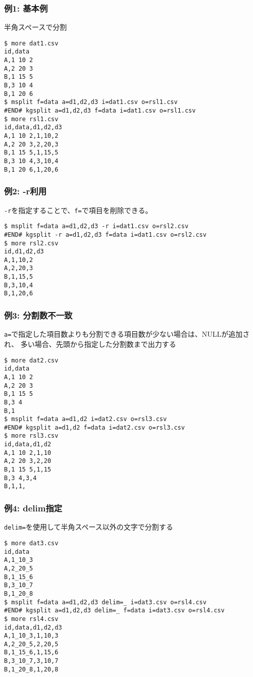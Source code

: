 \subsubsection*{例1: 基本例}

 半角スペースで分割


\begin{Verbatim}[baselinestretch=0.7,frame=single]
$ more dat1.csv
id,data
A,1 10 2
A,2 20 3
B,1 15 5
B,3 10 4
B,1 20 6
$ msplit f=data a=d1,d2,d3 i=dat1.csv o=rsl1.csv
#END# kgsplit a=d1,d2,d3 f=data i=dat1.csv o=rsl1.csv
$ more rsl1.csv
id,data,d1,d2,d3
A,1 10 2,1,10,2
A,2 20 3,2,20,3
B,1 15 5,1,15,5
B,3 10 4,3,10,4
B,1 20 6,1,20,6
\end{Verbatim}
\subsubsection*{例2: -r利用}

\verb|-r|を指定することで、\verb|f=|で項目を削除できる。


\begin{Verbatim}[baselinestretch=0.7,frame=single]
$ msplit f=data a=d1,d2,d3 -r i=dat1.csv o=rsl2.csv
#END# kgsplit -r a=d1,d2,d3 f=data i=dat1.csv o=rsl2.csv
$ more rsl2.csv
id,d1,d2,d3
A,1,10,2
A,2,20,3
B,1,15,5
B,3,10,4
B,1,20,6
\end{Verbatim}
\subsubsection*{例3: 分割数不一致}

\verb|a=|で指定した項目数よりも分割できる項目数が少ない場合は、NULLが追加され、
多い場合、先頭から指定した分割数まで出力する


\begin{Verbatim}[baselinestretch=0.7,frame=single]
$ more dat2.csv
id,data
A,1 10 2
A,2 20 3
B,1 15 5
B,3 4
B,1
$ msplit f=data a=d1,d2 i=dat2.csv o=rsl3.csv
#END# kgsplit a=d1,d2 f=data i=dat2.csv o=rsl3.csv
$ more rsl3.csv
id,data,d1,d2
A,1 10 2,1,10
A,2 20 3,2,20
B,1 15 5,1,15
B,3 4,3,4
B,1,1,
\end{Verbatim}
\subsubsection*{例4: delim指定}

\verb|delim=|を使用して半角スペース以外の文字で分割する


\begin{Verbatim}[baselinestretch=0.7,frame=single]
$ more dat3.csv
id,data
A,1_10_3
A,2_20_5
B,1_15_6
B,3_10_7
B,1_20_8
$ msplit f=data a=d1,d2,d3 delim=_ i=dat3.csv o=rsl4.csv
#END# kgsplit a=d1,d2,d3 delim=_ f=data i=dat3.csv o=rsl4.csv
$ more rsl4.csv
id,data,d1,d2,d3
A,1_10_3,1,10,3
A,2_20_5,2,20,5
B,1_15_6,1,15,6
B,3_10_7,3,10,7
B,1_20_8,1,20,8
\end{Verbatim}
